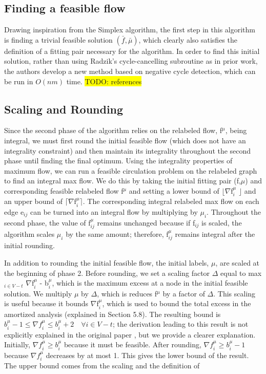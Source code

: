 \documentclass{article}
\newcommand{\todo}[1]{\colorbox{yellow}{TODO: #1}}
\begin{document}
    \subsection{Finding a feasible flow}
Drawing inspiration from the Simplex algorithm, the first step in this algorithm is finding a trivial feasible solution $(\bar{f}, \bar{\mu})$, which clearly also satisfies the definition of a fitting pair necessary for the algorithm. In order to find this initial solution, rather than using Radzik's cycle-cancelling subroutine as in prior work, the authors develop a new method based on negative cycle detection, which can be run in $O(nm)$ time. \todo{references} 
    
    \subsection{Scaling and Rounding} 
    Since the second phase of the algorithm relies on the relabeled flow, f$^\mu$, being integral, we must first round the initial feasible flow (which does not have an integrality constraint) and then maintain its integrality throughout the second phase until finding the final optimum. Using the integrality properties of maximum flow, we can run a feasible circulation problem on the relabeled graph to find an integral max flow. We do this by taking the initial fitting pair (f,$\mu$) and corresponding feasible relabeled flow f$^\mu$ and setting a lower bound of $\lfloor$$\nabla$f$_i^\mu$ $\rfloor$ and an upper bound of $\lceil$$\nabla$f$_i^\mu$$\rceil$. The corresponding integral relabeled max flow on each edge e$_{ij}$ can be turned into an integral flow by multiplying by $\mu_i$. Throughout the second phase, the value of f$_{ij}^\mu$ remains unchanged because if f$_{ij}$ is scaled, the algorithm scales $\mu_i$ by the same amount; therefore, f$_{ij}^\mu$ remains integral after the initial rounding.
    
    In addition to rounding the initial feasible flow, the initial labels, $\mu$, are scaled at the beginning of phase 2. Before rounding, we set a scaling factor $\Delta$ equal to max$_{i \in V -t}$ $\nabla$f$_i^\mu$ - b$_i^\mu$, which is the maximum excess at a node in the initial feasible solution. We multiply $\mu$ by $\Delta$, which is reduces f$^\mu$ by a factor of $\Delta$. This scaling is useful because it bounds $\nabla$f$_i^\mu$, which is used to bound the total excess in the amortized analysis (explained in Section 5.8). The resulting bound is $b_i^\mu - 1 \leq \nabla f_i^\mu \leq b_i^\mu + 2 \quad \forall i \in V-t $; the derivation leading to this result is not explicitly explained in the original paper \cite{Olver2017}, but we provide a clearer explanation. Initially, $\nabla f_i^\mu \geq b_i^\mu$ because it must be feasible. After rounding, $\nabla f_i^\mu \geq b_i^\mu - 1$ because $\nabla f_i^\mu$ decreases by at most 1. This gives the lower bound of the result. The upper bound comes from the scaling and the definition of  
\end{document}
